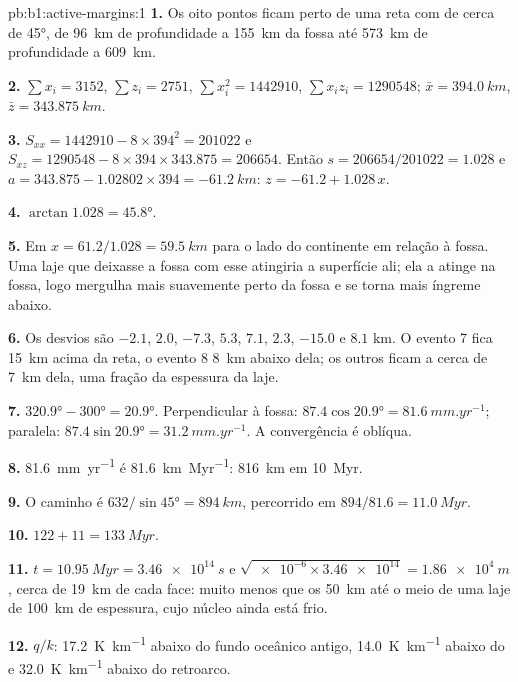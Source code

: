 \begin{solution}{pb:b1:active-margins:1}
\textbf{1.} Os oito pontos ficam perto de uma reta com  de cerca de
\ang{45}, de \qty{96}{km} de profundidade a \qty{155}{km} da fossa até
\qty{573}{km} de profundidade a \qty{609}{km}.

\textbf{2.} $\sum x_i = 3152$, $\sum z_i = 2751$, $\sum x_i^2 = \num{1442910}$,
$\sum x_i z_i = \num{1290548}$; $\bar x = \qty{394.0}{km}$,
$\bar z = \qty{343.875}{km}$.

\textbf{3.} $S_{xx} = 1442910 - 8\times394^2 = \num{201022}$ e
$S_{xz} = 1290548 - 8\times394\times343.875 = \num{206654}$. Então
$s = 206654/201022 = 1.028$ e $a = 343.875 - 1.02802\times394 =
\qty{-61.2}{km}$: $z = -61.2 + 1.028\,x$.

\textbf{4.} $\arctan1.028 = \ang{45.8}$.

\textbf{5.} Em $x = 61.2/1.028 = \qty{59.5}{km}$ para o lado do continente em relação à fossa. Uma laje que deixasse a fossa com esse  atingiria a superfície ali; ela a atinge na fossa, logo mergulha mais suavemente perto da fossa e se torna mais íngreme abaixo.

\textbf{6.} Os desvios são $-2.1$, $2.0$, $-7.3$, $5.3$, $7.1$, $2.3$,
$-15.0$ e $8.1$ \unit{km}. O evento 7 fica \qty{15}{km} acima da reta, o evento 8
\qty{8}{km} abaixo dela; os outros ficam a cerca de \qty{7}{km} dela, uma fração
da espessura da laje.

\textbf{7.} $\ang{320.9} - \ang{300} = \ang{20.9}$. Perpendicular à
fossa: $87.4\cos\ang{20.9} = \qty{81.6}{mm.yr^{-1}}$; paralela:
$87.4\sin\ang{20.9} = \qty{31.2}{mm.yr^{-1}}$. A convergência é oblíqua.

\textbf{8.} \qty{81.6}{mm.yr^{-1}} é \qty{81.6}{km.Myr^{-1}}: \qty{816}{km} em
\qty{10}{Myr}.

\textbf{9.} O caminho é $632/\sin\ang{45} = \qty{894}{km}$, percorrido em
$894/81.6 = \qty{11.0}{Myr}$.

\textbf{10.} $122 + 11 = \qty{133}{Myr}$.

\textbf{11.} $t = \qty{10.95}{Myr} = \qty{3.46e14}{s}$ e
$\sqrt{\num{e-6}\times\num{3.46e14}} = \qty{1.86e4}{m}$, cerca de \qty{19}{km}
de cada face: muito menos que os \qty{50}{km} até o meio de uma laje de
\qty{100}{km} de espessura, cujo núcleo ainda está frio.

\textbf{12.} $q/k$: \qty{17.2}{K.km^{-1}} abaixo do fundo oceânico antigo,
\qty{14.0}{K.km^{-1}} abaixo do  e \qty{32.0}{K.km^{-1}} abaixo do
retroarco.


\end{solution}
